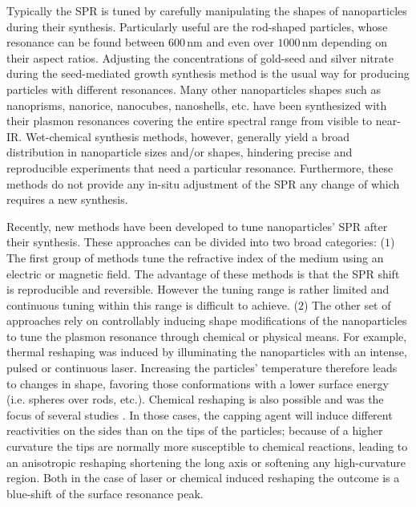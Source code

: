 \documentclass[a4paper,oneside,onecolumn]{article}
\newcommand{\nm}{\ensuremath{\,\textrm{nm}}}
\begin{document}
Typically the SPR is tuned by carefully manipulating the shapes of nanoparticles during their synthesis. Particularly useful are the rod-shaped particles, whose resonance can be found between $600\nm$ and even over $1000\nm$ depending on their aspect ratios. Adjusting the concentrations of gold-seed and silver nitrate during the seed-mediated growth synthesis method\cite{Vigderman2012} is the usual way for producing particles with different resonances. Many other nanoparticles shapes such as nanoprisms, nanorice, nanocubes, nanoshells, etc. have been synthesized with their plasmon resonances covering the entire spectral range from visible to near-IR\cite{Lal2007}. Wet-chemical synthesis methods, however, generally yield a broad distribution in nanoparticle sizes and/or shapes, hindering precise and reproducible experiments that need a particular resonance. Furthermore, these methods do not provide any in-situ adjustment of the SPR any change of which requires a new
synthesis.

Recently, new methods have been developed to tune nanoparticles' SPR after their
synthesis. These approaches can be divided into two broad categories: ($1$) The
first group of methods tune the refractive index of the medium using an electric
or magnetic field\cite{Kossyrev2005}. The advantage of these methods is that the
SPR shift is reproducible and reversible. However the tuning range is rather
limited and continuous tuning within this range is difficult to achieve.
($2$) The other set of approaches rely on controllably inducing shape
modifications of the nanoparticles to tune the plasmon resonance through
chemical or physical means. For example, thermal reshaping was induced by
illuminating the nanoparticles with an intense, pulsed
\cite{Link2000}\cite{Horiguchi2008} or continuous laser\cite{Yorulmaz2012}.
Increasing the particles' temperature therefore leads to changes in shape,
favoring those conformations with a lower surface energy (i.e.
spheres over rods, etc.). Chemical reshaping is also possible and was the focus
of several studies\cite{Carbo-Argibay2007}
\cite{Rodriguez-Fernandez2005} \cite{Jana2002}. In those cases, the capping
agent will induce different reactivities on the sides than on the tips of the
particles; because of a higher curvature\cite{Yuan2015} the tips are
normally more susceptible to chemical reactions, leading to an anisotropic reshaping
shortening the long axis or softening any high-curvature region. Both in the case
 of laser or chemical induced reshaping the outcome is a blue-shift of the surface
resonance peak.
\end{document}
